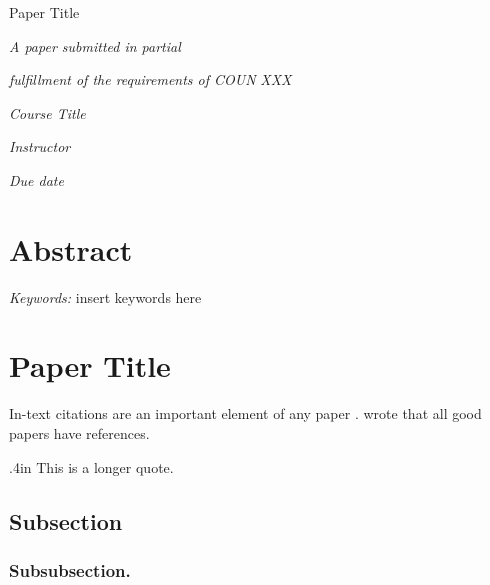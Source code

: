\documentclass[12pt]{article}
\author{Author}
\title{\papertitle}
\newcommand{\papertitle}{Paper Title}
\newcommand{\coursenumber}{XXX}
\newcommand{\coursetitle}{Course Title}
\newcommand{\instructor}{Instructor}
\newcommand{\duedate}{Due date}
\newcommand{\indentamount}{.4in}
\renewcommand{\maketitle}{
  \begin{center}
    \vspace*{150pt}

    \begin{singlespace}
      \papertitle

      \theauthor
    \end{singlespace}

    \vspace{50pt}

    \textit{A paper submitted in partial}

    \textit{fulfillment of the requirements of COUN}
    \textit{\coursenumber}

    \textit{\coursetitle}

    \textit{\instructor}

    \textit{\duedate}
  \end{center}
}
\newenvironment{longquote}{\begin{adjustwidth}{\indentamount}{}}{\end{adjustwidth}}
\begin{document}

\maketitle

\newpage



\section{Abstract}

\setlength{\parindent}{0pt}

\lipsum[6]

\setlength{\parindent}{\indentamount}

\textit{Keywords:} insert keywords here

\newpage



\section{\papertitle}

In-text citations are an important element of any paper \parencite[42–43]{test_1}.
\textcite{test_2} wrote that all good papers have references.

\begin{longquote}
This is a longer quote. \lipsum[2] \parencite{test_1}
\end{longquote}

\subsection{Subsection}

\lipsum[5]

\subsubsection{Subsubsection.}

\lipsum[5]



\newpage

\printbibliography
\end{document}

